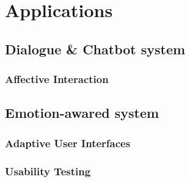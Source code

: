 \section{Applications}
\label{sec:applications}
\subsection{Dialogue \& Chatbot system}
\subsubsection{Affective Interaction}
\cite{Conati2005, Hutchison2011}

\subsection{Emotion-awared system}
\subsubsection{Adaptive User Interfaces}
\cite{Dalvand, Galindo, Kaiser2006}
\subsubsection{Usability Testing}

